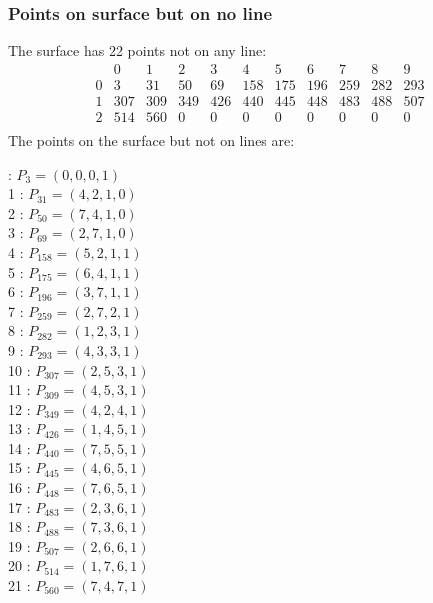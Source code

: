 \documentclass{article}
\begin{document}
{\subsubsection*{Points on surface but on no line}
The surface has 22 points not on any line:\\
$$
\begin{array}{r|*{10}{r}}
 & 0 & 1 & 2 & 3 & 4 & 5 & 6 & 7 & 8 & 9\\
\hline
0 & 3 & 31 & 50 & 69 & 158 & 175 & 196 & 259 & 282 & 293\\
1 & 307 & 309 & 349 & 426 & 440 & 445 & 448 & 483 & 488 & 507\\
2 & 514 & 560 & 0 & 0 & 0 & 0 & 0 & 0 & 0 & 0\\
\end{array}
$$
The points on the surface but not on lines are:\\
\begin{multicols}{2}
 : $P_{3}=( 0, 0, 0, 1 )$\\
1 : $P_{31}=( 4, 2, 1, 0 )$\\
2 : $P_{50}=( 7, 4, 1, 0 )$\\
3 : $P_{69}=( 2, 7, 1, 0 )$\\
4 : $P_{158}=( 5, 2, 1, 1 )$\\
5 : $P_{175}=( 6, 4, 1, 1 )$\\
6 : $P_{196}=( 3, 7, 1, 1 )$\\
7 : $P_{259}=( 2, 7, 2, 1 )$\\
8 : $P_{282}=( 1, 2, 3, 1 )$\\
9 : $P_{293}=( 4, 3, 3, 1 )$\\
10 : $P_{307}=( 2, 5, 3, 1 )$\\
11 : $P_{309}=( 4, 5, 3, 1 )$\\
12 : $P_{349}=( 4, 2, 4, 1 )$\\
13 : $P_{426}=( 1, 4, 5, 1 )$\\
14 : $P_{440}=( 7, 5, 5, 1 )$\\
15 : $P_{445}=( 4, 6, 5, 1 )$\\
16 : $P_{448}=( 7, 6, 5, 1 )$\\
17 : $P_{483}=( 2, 3, 6, 1 )$\\
18 : $P_{488}=( 7, 3, 6, 1 )$\\
19 : $P_{507}=( 2, 6, 6, 1 )$\\
20 : $P_{514}=( 1, 7, 6, 1 )$\\
21 : $P_{560}=( 7, 4, 7, 1 )$\\
\end{multicols}
}
\end{document}
